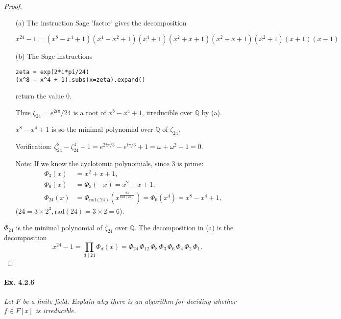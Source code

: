 \documentclass[11pt,a4paper]{article}
\begin{document}
\begin{proof}
\begin{enumerate}
\item[(a)] The instruction Sage  'factor' gives the decomposition

$x^{24}-1 = (x^8 - x^4 + 1)(x^4 - x^2 + 1)(x^4 + 1)(x^2 + x + 1)(x^2 - x +
1)(x^2 + 1)(x + 1)(x - 1)$


\item[(b)]
The Sage instructions
\begin{verbatim}
zeta = exp(2*i*pi/24)
(x^8 - x^4 + 1).subs(x=zeta).expand()
\end{verbatim}
return the value 0.

Thus $\zeta _{24} = e^{2i \pi}/24$ is a root of $x^8-x^{4}+1$, irreducible over $\mathbb{Q}$ by (a).

$x^8 - x^4+1$ is so the minimal polynomial over $\mathbb{Q}$ of $\zeta_{24}$.

Verification: $\zeta_{24}^8 - \zeta_{24}^4+1 = e^{2i\pi/3}-e^{i\pi/3}+1 = \omega+\omega^2+1 = 0$.


Note: If we know the cyclotomic polynomials, since $3$ is prime:
\begin{align*}
\Phi_3(x) &= x^2+x+1,\\
\Phi_6(x) &= \Phi_3(-x) = x^2-x+1,\\
\Phi_{24}(x) &= \Phi_{\mathrm{rad}(24)} (x^{\frac{24}{\mathrm{rad}(24)}}) = \Phi_6(x^4) = x^8 - x^4+1,
\end{align*}
($24 = 3\times2^3, \mathrm{rad}(24) = 3\times 2 = 6$).
\end{enumerate}
$\Phi_{24}$ is the minimal polynomial of $\zeta_{24}$ over $\mathbb{Q}$.
The decomposition in (a) is the decomposition
$$x^{24}-1 =\prod_{d\mid 24 }  \Phi_d(x) = \Phi_{24} \,\Phi_{12} \,\Phi_{8} \,\Phi_{3}\, \Phi_{6} \,\Phi_{4} \,\Phi_{2}\, \Phi_{1}.$$
\end{proof}

\paragraph{Ex. 4.2.6}

{\it Let $F$ be a finite field. Explain why there is an algorithm for deciding whether $f \in F[x]$ is irreducible.
}
\end{document}
